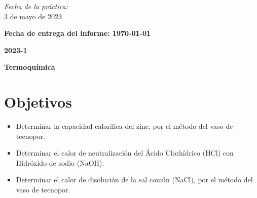 \documentclass[10pt]{article}
\begin{document}
\begin{center}
\vspace{-3.3cm}	
\begin{flushright}	
\large
\emph{Fecha de la práctica:}\\
\vspace{0.1cm}
3 de mayo de 2023
\end{flushright}
 \vspace{1.5cm}
\begin{flushleft}

\bfseries\large{Fecha de entrega del informe: \today}\\

\end{flushleft}	

\vspace{0.4cm}

{ \LARGE \bfseries 2023-1}

 															  			
\end{center}							 											
																					
\newpage																		

\tableofcontents 

\newpage
\begin{center}
    \textbf{\huge Termoquímica}
\end{center}

\section{Objetivos}
\begin{itemize}
    \item Determinar la capacidad calorífica del zinc, por el método del vaso de tecnopor.
    \item Determinar el calor de neutralización del Ácido Clorhídrico (HCl) con Hidróxido de sodio (NaOH).
    \item Determinar el calor de disolución de la sal común (NaCl), por el método del vaso de tecnopor.
\end{itemize} 
\end{document}
